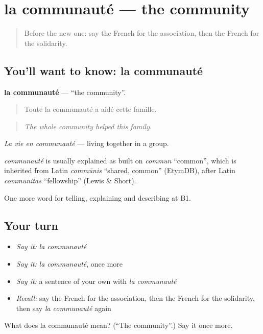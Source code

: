 \section[la communauté]{la communauté — the community}

\label{lesson:FR-C366-communaute}



\begin{quote}
Before the new one: say the French for the association, then the French for the solidarity.
\end{quote}

\subsection*{You'll want to know: la communauté}
\textbf{la communauté} — \textquotedblleft{}the community\textquotedblright{}.

\begin{quote}
Toute la communauté a aidé cette famille.
\end{quote}

\begin{quote}
\emph{The whole community helped this family.}
\end{quote}

\emph{La vie en communauté} — living together in a group.

\begin{cousinweb}
\emph{communauté} is usually explained as built on \emph{commun} \textquotedblleft{}common\textquotedblright{}, which is inherited from Latin \emph{commūnis} \textquotedblleft{}shared, common\textquotedblright{} (EtymDB), after Latin \emph{commūnitās} \textquotedblleft{}fellowship\textquotedblright{} (Lewis \& Short).
\end{cousinweb}

\begin{grammarlens}[title={What you've built}]
One more word for telling, explaining and describing at B1.
\end{grammarlens}

\subsection*{Your turn}
\begin{itemize}
\raggedright
  \item \emph{Say it:} \emph{la communauté}
  \item \emph{Say it:} \emph{la communauté}, once more
  \item \emph{Say it:} a sentence of your own with \emph{la communauté}
  \item \emph{Recall:} say the French for the association, then the French for the solidarity, then say \emph{la communauté} again
\end{itemize}

\begin{tcolorbox}[breakable,colback=teal!4,colframe=teal!35!black,title={Before you move on}]
What does la communauté mean? (\textquotedblleft{}The community\textquotedblright{}.) Say it once more.
\end{tcolorbox}
